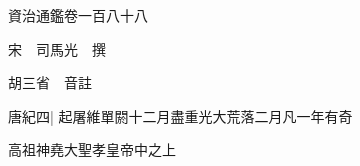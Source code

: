 






























































資治通鑑卷一百八十八

宋　司馬光　撰

胡三省　音註

唐紀四|{
	起屠維單閼十二月盡重光大荒落二月凡一年有奇}


高祖神堯大聖孝皇帝中之上

